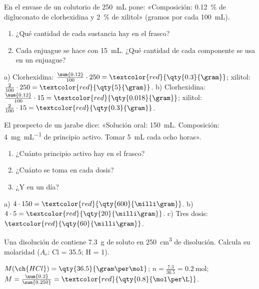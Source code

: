 \begin{exercise}
    En el envase de un colutorio de \qty{250}{\mL} pone: «Composición: \qty{0.12}{\percent} de digluconato de clorhexidina y \qty{2}{\percent} de xilitol» (gramos por cada \qty{100}{\mL}).
    \begin{enumerate}[label=\alph*)]
        \item ¿Qué cantidad de cada sustancia hay en el frasco?
        \item Cada enjuague se hace con \qty{15}{\mL}. ¿Qué cantidad de cada componente se usa en un enjuague?
    \end{enumerate}
    \begin{solu}
        a) Clorhexidina: \(\frac{\num{0.12}}{100} \cdot 250 = \textcolor{red}{\qty{0.3}{\gram}}\); xilitol: \(\frac{2}{100} \cdot 250 = \textcolor{red}{\qty{5}{\gram}}\).
        b) Clorhexidina: \(\frac{\num{0.12}}{100} \cdot 15 = \textcolor{red}{\qty{0.018}{\gram}}\); xilitol: \(\frac{2}{100} \cdot 15 = \textcolor{red}{\qty{0.3}{\gram}}\).
    \end{solu}
\end{exercise}

\begin{exercise}
    El prospecto de un jarabe dice: «Solución oral: \qty{150}{\mL}. Composición: \qty{4}{\milli\gram\per\mL} de principio activo. Tomar \qty{5}{\mL} cada ocho horas».
    \begin{enumerate}[label=\alph*)]
        \item ¿Cuánto principio activo hay en el frasco?
        \item ¿Cuánto se toma en cada dosis?
        \item ¿Y en un día?
    \end{enumerate}
    \begin{solu}
        a) \(4 \cdot 150 = \textcolor{red}{\qty{600}{\milli\gram}}\). b) \(4 \cdot 5 = \textcolor{red}{\qty{20}{\milli\gram}}\). c) Tres dosis: \(\textcolor{red}{\qty{60}{\milli\gram}}\).
    \end{solu}
\end{exercise}

\begin{exercise}
    Una disolución de  contiene \qty{7.3}{\gram} de soluto en \qty{250}{\cubic\centi\metre} de disolución. Calcula su molaridad (\(A_r\): Cl = \num{35.5}; H = 1).
    \begin{solu}
        \(M(\ch{HCl}) = \qty{36.5}{\gram\per\mol}\); \(n = \frac{\num{7.3}}{\num{36.5}} = \qty{0.2}{\mol}\); \(M = \frac{\num{0.2}}{\num{0.250}} = \textcolor{red}{\qty{0.8}{\mol\per\L}}\).
    \end{solu}
\end{exercise}

